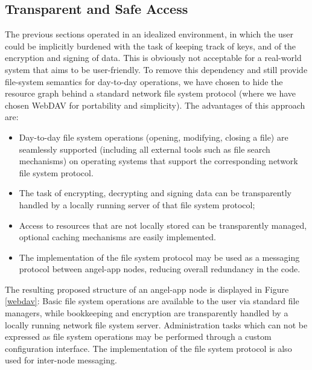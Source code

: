 \documentclass[11pt]{article}
\begin{document}
\begin{mainmatter}
\subsection{Transparent and Safe Access}
\label{access}

The previous sections operated in an idealized environment, in which the user could be implicitly burdened with the task of keeping track of keys,  and of the encryption and signing of data. This is obviously not acceptable for a real-world system that aims to be user-friendly. To remove this dependency and still provide file-system semantics for day-to-day operations, we have chosen to hide the resource graph behind a standard network file system protocol (where we have chosen WebDAV for portability and simplicity). The advantages of this approach are:
\begin{itemize}
\item Day-to-day file system operations (opening, modifying, closing a file) are seamlessly supported (including all external tools such as file search mechanisms) on operating systems that support the corresponding network file system protocol.
\item The task of encrypting, decrypting and signing data can be transparently handled by a locally running server of that file system protocol;
\item Access to resources that are not locally stored can be transparently managed, optional caching mechanisms are easily implemented.
\item The implementation of the file system protocol may be used as a messaging protocol between angel-app nodes, reducing overall redundancy in the code.
\end{itemize} 

The resulting proposed structure of an angel-app node is displayed in Figure \ref{webdav}: Basic file system operations are available to the user via standard file managers, while bookkeeping and encryption are transparently handled by a locally running network file system server. Administration tasks which can not be expressed as file system operations may be performed through a custom configuration interface. The implementation of the file system protocol is also used for inter-node messaging.


\end{mainmatter}
\end{document}
